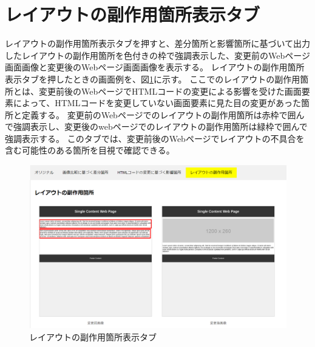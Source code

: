 \section{レイアウトの副作用箇所表示タブ}\label{subsec:subeffect_tab}
レイアウトの副作用箇所表示タブを押すと、差分箇所と影響箇所に基づいて出力したレイアウトの副作用箇所を色付きの枠で強調表示した、変更前のWebページ画面画像と変更後のWebページ画面画像を表示する。
レイアウトの副作用箇所表示タブを押したときの画面例を、図\ref{fig: Appearance_subEffect_tab}に示す。
ここでのレイアウトの副作用箇所とは、変更前後のWebページでHTMLコードの変更による影響を受けた画面要素によって、HTMLコードを変更していない画面要素に見た目の変更があった箇所と定義する。
変更前のWebページでのレイアウトの副作用箇所は赤枠で囲んで強調表示し、変更後のwebページでのレイアウトの副作用箇所は緑枠で囲んで強調表示する。
このタブでは、変更前後のWebページでレイアウトの不具合を含む可能性のある箇所を目視で確認できる。
\begin{figure}[tp]
    \begin{center}
        \includegraphics[width=1.0\columnwidth]{image/3_subEffect_tab.png}
        \caption{レイアウトの副作用箇所表示タブ}
        \label{fig: Appearance_subEffect_tab}
    \end{center}
\end{figure}

